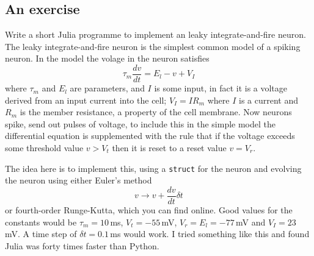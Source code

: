 \documentclass[11pt,a4paper]{scrartcl}
\begin{document}
\subsection*{An exercise}

Write a short Julia programme to implement an leaky integrate-and-fire
neuron. The leaky integrate-and-fire neuron is the simplest common
model of a spiking neuron. In the model the volage in the neuron
satisfies
\begin{equation}
\tau_m \frac{dv}{dt}=E_l-v+V_I
\end{equation}
where $\tau_m$ and $E_l$ are parameters, and $I$ is some input, in
fact it is a voltage derived from an input current into the cell;
$V_I=IR_m$ where $I$ is a current and $R_m$ is the member resistance,
a property of the cell membrane. Now neurons spike, send out pulses of
voltage, to include this in the simple model the differential equation
is supplemented with the rule that if the voltage exceeds some
threshold value $v>V_t$ then it is reset to a reset value $v=V_r$.

The idea here is to implement this, using a \texttt{struct} for the
neuron and evolving the neuron using either Euler's method
\begin{equation}
v\rightarrow v+\frac{dv}{dt}\delta t
\end{equation}
or fourth-order Runge-Kutta, which you can find online. Good values
for the constants would be $\tau_m=10\,$ms, $V_t=-55\,$mV,
$V_r=E_l=-77\,$mV and $V_I=23\,$mV. A time step of $\delta t=0.1\,$ms
would work. I tried something like this and found Julia was forty
times faster than Python.
\end{document}
